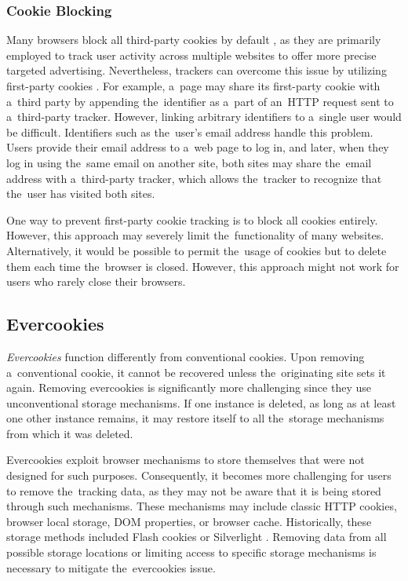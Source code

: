 \subsubsection{Cookie Blocking}
Many browsers block all third-party cookies by default \cite{cookies-use-iframe}, as they are primarily employed to track user activity across multiple websites to offer more precise targeted advertising. Nevertheless, trackers can overcome this issue by utilizing first-party cookies \cite{cookies-use-iframe}. 
For example, a~page may share its first-party cookie with a~third party by appending the~identifier as a~part of an~HTTP request sent to a~third-party tracker. However, linking arbitrary identifiers to a~single user would be difficult. Identifiers such as the~user's email address handle this problem. Users provide their email address to a~web page to log in, and later, when they log in using the~same email on another site, both sites may share the~email address with a~third-party tracker, which allows the~tracker to recognize that the~user has visited both sites.

One way to prevent first-party cookie tracking is to block all cookies entirely. However, this approach may severely limit the~functionality of many websites. Alternatively, it would be possible to permit the~usage of cookies but to delete them each time the~browser is closed. However, this approach might not work for users who rarely close their browsers.

\subsection{Evercookies}
\label{supercookies}

\textit{Evercookies} \cite{supercookies} function differently from conventional cookies. Upon removing a~conventional cookie, it cannot be recovered unless the~originating site sets it again. Removing evercookies is significantly more challenging since they use unconventional storage mechanisms. If one instance is deleted, as long as at least one other instance remains, it may restore itself to all the~storage mechanisms from which it was deleted.

Evercookies exploit browser mechanisms to store themselves that were not designed for such purposes. Consequently, it becomes more challenging for users to remove the~tracking data, as they may not be aware that it is being stored through such mechanisms. These mechanisms may include classic HTTP cookies, browser local storage, DOM properties, or browser cache. Historically, these storage methods included Flash cookies or Silverlight \cite{supercookies}. Removing data from all possible storage locations or limiting access to specific storage mechanisms is necessary to mitigate the~evercookies issue.

